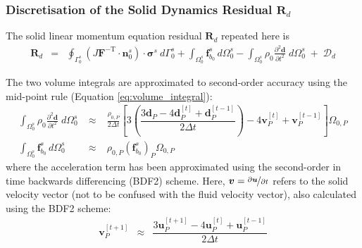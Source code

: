 \documentclass[sn-mathphys,Numbered]{sn-jnl}%
\newcommand{\bb}{\boldsymbol}
\begin{document}
\subsubsection[Discretisation of the Solid Dynamics Residual]{Discretisation of the Solid Dynamics Residual $\bb{R}_d$}
The solid linear momentum equation residual $\bb{R}_d$ repeated here is
\begin{eqnarray}
    \bb{R}_d
    &=&
    \oint_{\Gamma_0^s} \left( J \bb{F}^{-\text{T}} \cdot \bb{n}_0^s \right) \cdot \bb{\sigma}^s \ d\Gamma_0^s
    + \int_{\Omega_0^s}  \bb{f}_{b_0}^s \, d\Omega_0^s
    - \int_{\Omega_0^s} \rho_0 \frac{\partial^2 \bb{d} }{\partial t^2} \; d\Omega_0^s
    \;+\; \bb{\mathcal{D}}_d
\end{eqnarray}

The two volume integrals are approximated to second-order accuracy using the mid-point rule (Equation \ref{eq:volume_integral}):
\begin{eqnarray}
	\int_{\Omega_0^s} \rho_0 \frac{\partial^2 \bb{d} }{\partial t^2} \; d\Omega_0^s
		\;&\approx&\; \frac{\rho_{0,P}}{2\Delta t}
		\left[
			3\left( 
			\dfrac{3\boldsymbol{d}_P - 4\boldsymbol{d}_P^{[t]} + \boldsymbol{d}_P^{[t-1]}}{2\Delta t} 
			\right) 
			- 4\boldsymbol{v}_P^{[t]} + \boldsymbol{v}_P^{[t-1]}
		\right] \Omega_{0,P} \\
	\int_{\Omega_0^s}  \bb{f}_{b_0}^s \, d\Omega_0^s
		\;&\approx&\;  \rho_{0,P} \left(\bb{f}^s_{b_0}\right)_P \Omega_{0,P}
\end{eqnarray}
where the acceleration term has been approximated using the second-order in time backwards differencing (BDF2) scheme.
Here, $\boldsymbol{v} = \nicefrac{\partial \bb{u}}{\partial t}$ refers to the solid velocity vector (not to be confused with the fluid velocity vector), also calculated using the BDF2 scheme:
 \begin{eqnarray}
	\boldsymbol{v}_P^{[t+1]}	&\approx&
		\dfrac{3\boldsymbol{u}_P^{[t+1]} - 4\boldsymbol{u}_P^{[t]} + \boldsymbol{u}_P^{[t-1]}}{2\Delta t} 
\end{eqnarray}
\end{document}
